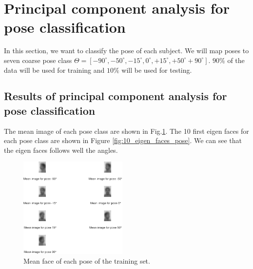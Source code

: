 \documentclass[runningheads,a4paper]{llncs}
\begin{document}
\section{Principal component analysis for pose classification}

In this section, we want to classify the pose of each subject. We will map poses to seven coarse pose class $\Theta=[ -90^{\circ},-50^{\circ},-15^{\circ},0^{\circ},+15^{\circ},+50^{\circ}+90^{\circ}]$. $90\%$ of the data will be used  for training and $10\%$ will be used for testing.

\subsection{Results of principal component analysis for pose classification}

The mean image of each pose class are shown in Fig.\ref{fig:mean_image_pose}. The 10 first eigen faces for each pose class are shown in Figure \ref{fig:10_eigen_faces_pose}. We can see that the eigen faces follows well the angles.

\begin{figure}
\centering
\includegraphics[height=5cm]{Figures/mean_image_pose}
\caption{Mean face of each pose of the training set.}
\label{fig:mean_image_pose}
\end{figure}
\end{document}
